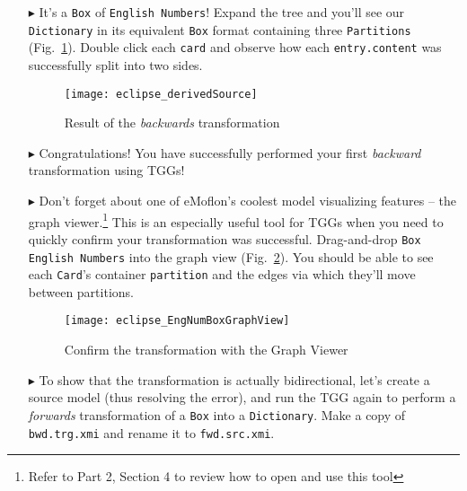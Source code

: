 \begin{itemize}
\item[$\blacktriangleright$] It's a \texttt{Box} of \texttt{English Numbers}! Expand the tree and you'll see our \texttt{Dictionary} in its equivalent
\texttt{Box} format containing three \texttt{Par\-ti\-tions} (Fig.~\ref{eclipse:derivedBOX}). Double click each \texttt{card} and observe how each
\texttt{entry.content} was successfully split into two sides.

\vspace{0.5cm}

\begin{figure}[htbp]
\begin{center}
  \texttt{[image: eclipse\_derivedSource]}
  \caption{Result of the \emph{backwards} transformation}
  \label{eclipse:derivedBOX}
\end{center}
\end{figure}

\vspace{-0.5cm}

\item[$\blacktriangleright$] Congratulations! You have successfully performed your first \emph{backward} transformation using TGGs!

\newpage

\item[$\blacktriangleright$] Don't forget about one of eMoflon's coolest model visualizing features -- the graph viewer.\footnote{Refer to Part 2, Section 4 to
review how to open and use this tool} This is an especially useful tool for TGGs when you need to quickly confirm your transformation was successful.
Drag-and-drop \texttt{Box English Numbers} into the graph view (Fig.~\ref{eclipse:graphView}). You should be able to see each \texttt{Card}'s container
\texttt{partition} and the edges via which they'll move between partitions.

\vspace{0.5cm}

\begin{figure}[htb]
\begin{center}
  \texttt{[image: eclipse\_EngNumBoxGraphView]}
  \caption{Confirm the transformation with the Graph Viewer}
  \label{eclipse:graphView}
\end{center}
\end{figure}

\vspace{0.5cm}

\item[$\blacktriangleright$] To show that the transformation is actually bidirectional, let's create a source model (thus resolving the error), and run
the TGG again to perform a \emph{forwards} transformation of a \texttt{Box} into a \texttt{Dictionary}. Make a copy of \texttt{bwd.trg.xmi} and rename
it to \texttt{fwd.src.xmi}.


\end{itemize}
